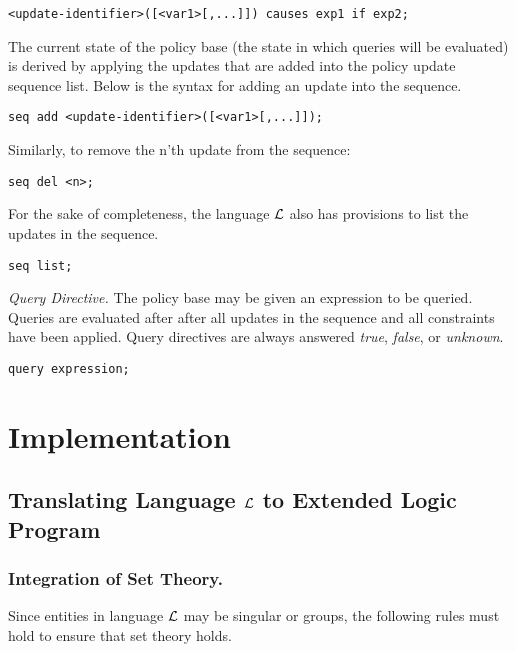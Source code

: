 \documentclass{llncs}
\begin{document}
    \begin{verbatim}<update-identifier>([<var1>[,...]]) causes exp1 if exp2;\end{verbatim}

    The current state of the policy base (the state in which queries will be
    evaluated) is derived by applying the updates that are added into
    the policy update sequence list. Below is the syntax for adding an
    update into the sequence.

    \begin{verbatim}seq add <update-identifier>([<var1>[,...]]);\end{verbatim}

    Similarly, to remove the n'th update from the sequence:

    \begin{verbatim}seq del <n>;\end{verbatim}

    For the sake of completeness, the language $\cal{L}$ also has provisions to
    list the updates in the sequence.

    \begin{verbatim}seq list;\end{verbatim}

    \emph{Query Directive.} The policy base may be given an expression to be
    queried. Queries are evaluated after after all updates in the
    sequence and all constraints have been applied. Query directives are
    always answered \emph{true}, \emph{false}, or \emph{unknown}.

    \begin{verbatim}query expression;\end{verbatim}

  \section{Implementation}

    \subsection{Translating Language $\cal{L}$ to Extended Logic Program}

      \subsubsection{Integration of Set Theory.}

        Since entities in language $\cal{L}$ may be singular or groups,
        the following rules must hold to ensure that set theory holds.
\end{document}
